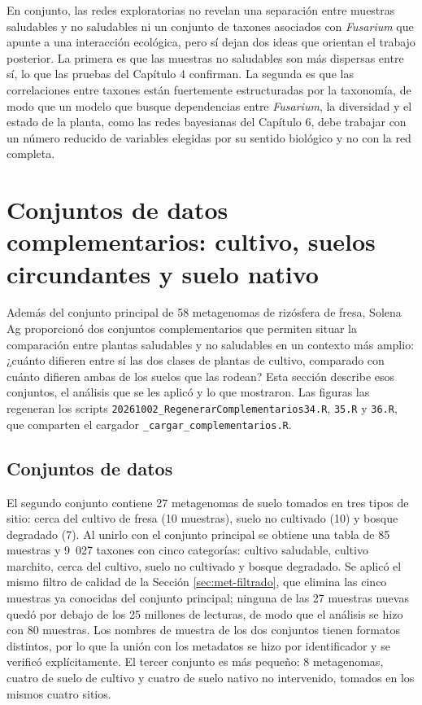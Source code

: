 En conjunto, las redes exploratorias no revelan una separación entre muestras saludables y no
saludables ni un conjunto de taxones asociados con \textit{Fusarium} que apunte a una interacción
ecológica, pero sí dejan dos ideas que orientan el trabajo posterior. La primera es que las
muestras no saludables son más dispersas entre sí, lo que las pruebas del Capítulo 4 confirman.
La segunda es que las correlaciones entre taxones están fuertemente estructuradas por la
taxonomía, de modo que un modelo que busque dependencias entre \textit{Fusarium}, la diversidad y
el estado de la planta, como las redes bayesianas del Capítulo 6, debe trabajar con un número
reducido de variables elegidas por su sentido biológico y no con la red completa.

\section[Conjuntos de datos complementarios]{Conjuntos de datos complementarios: cultivo, suelos circundantes y suelo nativo}
\label{sec:met-complementarios}

Además del conjunto principal de 58 metagenomas de rizósfera de fresa, Solena Ag proporcionó dos
conjuntos complementarios que permiten situar la comparación entre plantas saludables y no
saludables en un contexto más amplio: ¿cuánto difieren entre sí las dos clases de plantas de
cultivo, comparado con cuánto difieren ambas de los suelos que las rodean? Esta sección describe
esos conjuntos, el análisis que se les aplicó y lo que mostraron. Las figuras las regeneran los
scripts \texttt{20261002\_RegenerarComplementarios34.R}, \texttt{35.R} y \texttt{36.R}, que
comparten el cargador \texttt{\_cargar\_complementarios.R}.

\subsection{Conjuntos de datos}

El segundo conjunto contiene 27 metagenomas de suelo tomados en tres tipos de sitio: cerca del
cultivo de fresa (10 muestras), suelo no cultivado (10) y bosque degradado (7). Al unirlo con el
conjunto principal se obtiene una tabla de 85 muestras y 9~027 taxones con cinco categorías:
cultivo saludable, cultivo marchito, cerca del cultivo, suelo no cultivado y bosque degradado. Se
aplicó el mismo filtro de calidad de la Sección \ref{sec:met-filtrado}, que elimina las cinco muestras ya conocidas
del conjunto principal; ninguna de las 27 muestras nuevas quedó por debajo de los 25 millones de
lecturas, de modo que el análisis se hizo con 80 muestras. Los nombres de muestra de los dos
conjuntos tienen formatos distintos, por lo que la unión con los metadatos se hizo por identificador
y se verificó explícitamente. El tercer conjunto es más pequeño: 8 metagenomas, cuatro de suelo de
cultivo y cuatro de suelo nativo no intervenido, tomados en los mismos cuatro sitios.

